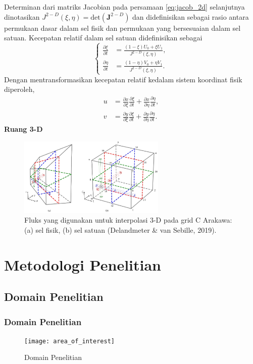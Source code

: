 \documentclass{beamer}
\begin{document}
\begin{frame}[allowframebreaks]
	Determinan dari matriks Jacobian pada persamaan \ref{eq:jacob_2d} selanjutnya dinotasikan $J^{2-D}(\xi,\eta)=\text{det}(\textbf{J}^{2-D})$ dan didefinisikan sebagai rasio antara permukaan dasar dalam sel fisik dan permukaan yang bersesuaian dalam sel satuan. Kecepatan relatif dalam sel satuan didefinisikan sebagai
	\begin{equation}
		\begin{cases}
			\frac{\partial \xi}{\partial t} &= \frac{(1-\xi)U_0+\xi U_1}{J^{2-D}(\xi,\eta)}, \\
			\frac{\partial \eta}{\partial t} &= \frac{(1-\eta)V_0+\eta V_1}{J^{2-D}(\xi,\eta)}.
		\end{cases}	
	\end{equation}
	Dengan mentransformasikan kecepatan relatif kedalam sistem koordinat fisik diperoleh,
	\begin{equation*}
		\begin{aligned}
			u &= \frac{\partial x}{\partial \xi}\frac{\partial \xi}{\partial t}+\frac{\partial x}{\partial \eta}\frac{\partial \eta}{\partial t}, \\
			v &= \frac{\partial y}{\partial \xi}\frac{\partial \xi}{\partial t}+\frac{\partial y}{\partial \eta}\frac{\partial \eta}{\partial t}.
		\end{aligned}	
	\end{equation*}
	\newpage
	\textbf{\large Ruang 3-D} \\
	\begin{figure}[H]
		\centering
		\includegraphics[width=7cm]{mesh_arakawa3d.jpg}
		\caption{Fluks yang digunakan untuk interpolasi 3-D pada grid C Arakawa: (a) sel fisik, (b) sel satuan (Delandmeter \& van Sebille, 2019).}
		\label{fig:mesh3d}
	\end{figure}
	
\end{frame}

\section{Metodologi Penelitian}
\subsection{Domain Penelitian}
\begin{frame}
	\frametitle{Domain Penelitian}
	\begin{figure}[H]
		\centering
		\texttt{[image: area\_of\_interest]}
		\caption{Domain Penelitian}
		\label{fig:domain}
	\end{figure}
\end{frame}
\end{document}
